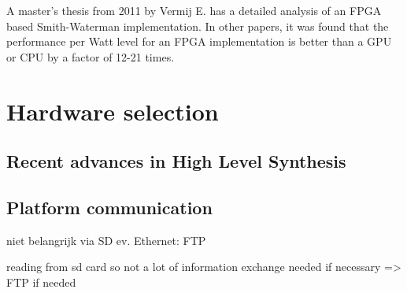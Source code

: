 A master's thesis from 2011 by Vermij E. has a detailed analysis of an FPGA based Smith-Waterman implementation. In other papers, it was found that the performance per Watt level for an FPGA implementation is better than a GPU or CPU by a factor of 12-21 times.

\section{Hardware selection}

\subsection{Recent advances in High Level Synthesis}

\subsection{Platform communication}
niet belangrijk
via SD
ev. Ethernet: FTP

reading from sd card so not a lot of information exchange needed
if necessary => FTP if needed

